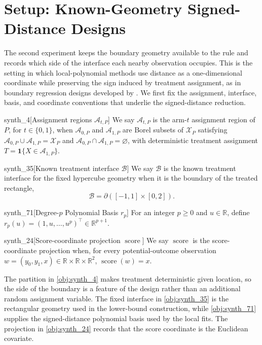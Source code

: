 \section{Setup: Known-Geometry Signed-Distance Designs}
\label{sec:signed-setup}

The second experiment keeps the boundary geometry available to the rule and records which side of the interface each nearby observation occupies. This is the setting in which local-polynomial methods use distance as a one-dimensional coordinate while preserving the sign induced by treatment assignment, as in boundary regression designs developed by \citet{CattaneoTitiunikYu2026Distance}. We first fix the assignment, interface, basis, and coordinate conventions that underlie the signed-distance reduction.

\begin{definitionv}{synth_4}[Assignment regions $\mathcal A_{t,P}$]
We say $\mathcal A_{t,P}$ is the arm-$t$ assignment region of $P$, for $t\in\{0,1\}$, when $\mathcal A_{0,P}$ and $\mathcal A_{1,P}$ are Borel subsets of $\mathcal X_P$ satisfying $\mathcal A_{0,P}\cup\mathcal A_{1,P}=\mathcal X_P$ and $\mathcal A_{0,P}\cap\mathcal A_{1,P}=\varnothing$, with deterministic treatment assignment $T=\mathbf 1\{X\in\mathcal A_{1,P}\}$.
\end{definitionv}

\begin{definitionv}{synth_35}[Known treatment interface \(\mathcal B\)]
We say \(\mathcal B\) is the known treatment interface for the fixed hypercube geometry when it is the boundary of the treated rectangle,\[\mathcal B=\partial([-1,1]\times[0,2]).\]
\end{definitionv}

\begin{definitionv}{synth_71}[Degree-$p$ Polynomial Basis $r_p$]
For an integer $p\geq0$ and $u\in\mathbb R$, define $r_p(u)=(1,u,\ldots,u^p)^\top\in\mathbb R^{p+1}$.
\end{definitionv}

\begin{definitionv}{synth_24}[Score-coordinate projection $\operatorname{score}$]
We say $\operatorname{score}$ is the score-coordinate projection when, for every potential-outcome observation $w=(y_0,y_1,x)\in\mathbb R\times\mathbb R\times\mathbb R^2$, $\operatorname{score}(w)=x$.
\end{definitionv}

The partition in \cref{obj:synth_4} makes treatment deterministic given location, so the side of the boundary is a feature of the design rather than an additional random assignment variable. The fixed interface in \cref{obj:synth_35} is the rectangular geometry used in the lower-bound construction, while \cref{obj:synth_71} supplies the signed-distance polynomial basis used by the local fits. The projection in \cref{obj:synth_24} records that the score coordinate is the Euclidean covariate.

